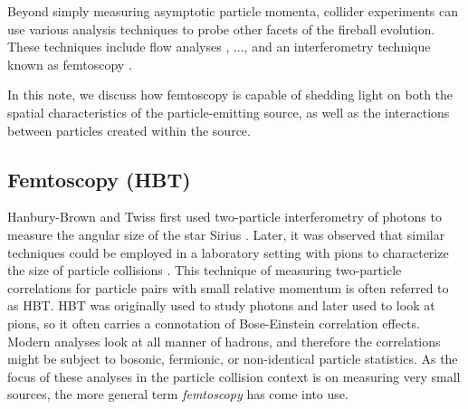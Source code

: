 




% 


Beyond simply measuring asymptotic particle momenta, collider experiments can use various analysis techniques to probe other facets of the fireball evolution.
These techniques include flow analyses \cite{...}, ..., and an interferometry technique known as femtoscopy \cite{...}.




In this note, we discuss how femtoscopy is capable of shedding light on both the spatial characteristics of the particle-emitting source, as well as the interactions between particles created within the source.




\subsection{Femtoscopy (HBT)}

Hanbury-Brown and Twiss first used two-particle interferometry of photons to measure the angular size of the star Sirius \cite{HanburyBrown:1956bqd}.
Later, it was observed that similar techniques could be employed in a laboratory setting with pions to characterize the size of particle collisions \cite{Goldhaber:1960sf}.
This technique of measuring two-particle correlations for particle pairs with small relative momentum is often referred to as HBT.
HBT was originally used to study photons and later used to look at pions, so it often carries a connotation of Bose-Einstein correlation effects.
Modern analyses look at all manner of hadrons, and therefore the correlations might be subject to bosonic, fermionic, or non-identical particle statistics.
As the focus of these analyses in the particle collision context is on measuring very small sources, the more general term \textit{femtoscopy} has come into use.

